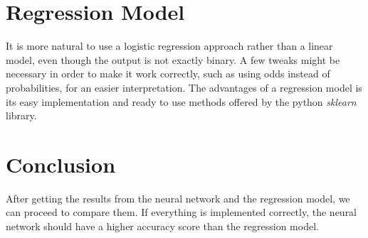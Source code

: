 \documentclass{article}
\begin{document}
\section{Regression Model}
It is more natural to use a logistic regression approach rather than a linear model, even though the output is not exactly binary. A few tweaks might be necessary in order to make it work correctly, such as using odds instead of probabilities, for an easier interpretation.
The advantages of a regression model is its easy implementation and ready to use methods offered by the python \textit{sklearn} library.
\section{Conclusion}
After getting the results from the neural network and the regression model, we can proceed to compare them. If everything is implemented correctly, the neural network should have a higher accuracy score than the regression model.



\end{document}
